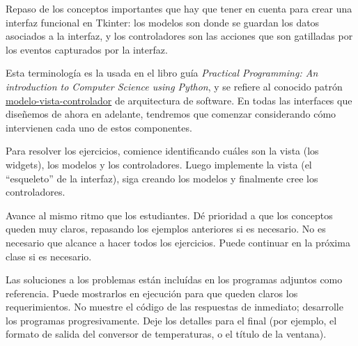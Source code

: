 \documentclass[10pt]{article}
\begin{document}

  Repaso de los conceptos importantes
  que hay que tener en cuenta para crear una interfaz funcional en Tkinter:
  los modelos son donde se guardan los datos asociados a la interfaz,
  y los controladores son las acciones que son gatilladas por los eventos
  capturados por la interfaz.

  Esta terminología es la usada en el libro guía
  \emph{Practical Programming: An introduction to Computer Science using Python},
  y se refiere al conocido patrón \href{http://es.wikipedia.org/wiki/Modelo_Vista_Controlador}{modelo-vista-controlador}
  de arquitectura de software.
  En todas las interfaces que diseñemos de ahora en adelante,
  tendremos que comenzar considerando cómo intervienen cada uno de estos componentes.


  Para resolver los ejercicios,
  comience identificando cuáles son la vista (los widgets),
  los modelos y los controladores.
  Luego implemente la vista (el ``esqueleto'' de la interfaz),
  siga creando los modelos
  y finalmente cree los controladores.

  Avance al mismo ritmo que los estudiantes.
  Dé prioridad a que los conceptos queden muy claros,
  repasando los ejemplos anteriores si es necesario.
  No es necesario que alcance a hacer todos los ejercicios.
  Puede continuar en la próxima clase si es necesario.

  Las soluciones a los problemas están incluídas
  en los programas adjuntos como referencia.
  Puede mostrarlos en ejecución
  para que queden claros los requerimientos.
  No muestre el código de las respuestas de inmediato;
  desarrolle los programas progresivamente.
  Deje los detalles para el final
  (por ejemplo, el formato de salida del conversor de temperaturas,
  o el título de la ventana).
\end{document}
